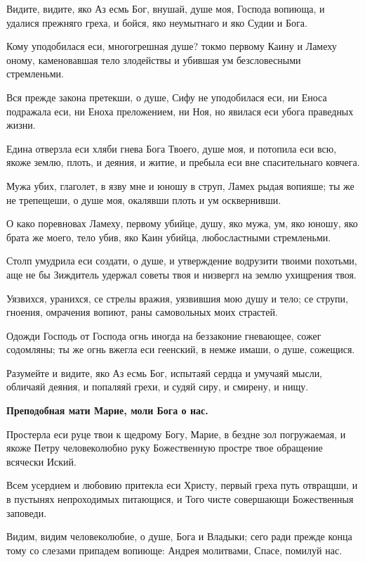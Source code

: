 Видите, видите, яко Аз есмь Бог, внушай, душе моя, Господа вопиюща, и удалися прежняго греха, и бойся, яко неумытнаго и яко Судии и Бога.

Кому уподобилася еси, многогрешная душе? токмо первому Каину и Ламеху оному, каменовавшая тело злодействы и убившая ум безсловесными стремленьми.

Вся прежде закона претекши, о душе, Сифу не уподобилася еси, ни Еноса подражала еси, ни Еноха преложением, ни Ноя, но явилася еси убога праведных жизни.

Едина отверзла еси хляби гнева Бога Твоего, душе моя, и потопила еси всю, якоже землю, плоть, и деяния, и житие, и пребыла еси вне спасительнаго ковчега.

Мужа убих, глаголет, в язву мне и юношу в струп, Ламех рыдая вопияше; ты же не трепещеши, о душе моя, окалявши плоть и ум осквернивши.

О како поревновах Ламеху, первому убийце, душу, яко мужа, ум, яко юношу, яко брата же моего, тело убив, яко Каин убийца, любосластными стремленьми.

Столп умудрила еси создати, о душе, и утверждение водрузити твоими похотьми, аще не бы Зиждитель удержал советы твоя и низвергл на землю ухищрения твоя.

Уязвихся, уранихся, се стрелы вражия, уязвившия мою душу и тело; се струпи, гноения, омрачения вопиют, раны самовольных моих страстей.

Одожди Господь от Господа огнь иногда на беззаконие гневающее, сожег содомляны; ты же огнь вжегла еси геенский, в немже имаши, о душе, сожещися.

Разумейте и видите, яко Аз есмь Бог, испытаяй сердца и умучаяй мысли, обличаяй деяния, и попаляяй грехи, и судяй сиру, и смирену, и нищу.

\bfseries Преподобная мати Марие, моли Бога о нас.

\normalfont{}Простерла еси руце твои к щедрому Богу, Марие, в бездне зол погружаемая, и якоже Петру человеколюбно руку Божественную простре твое обращение всячески Иский.


Всем усердием и любовию притекла еси Христу, первый греха путь отвращши, и в пустынях непроходимых питающися, и Того чисте совершающи Божественныя заповеди.


Видим, видим человеколюбие, о душе, Бога и Владыки; сего ради прежде конца тому со слезами припадем вопиюще: Андрея молитвами, Спасе, помилуй нас.


